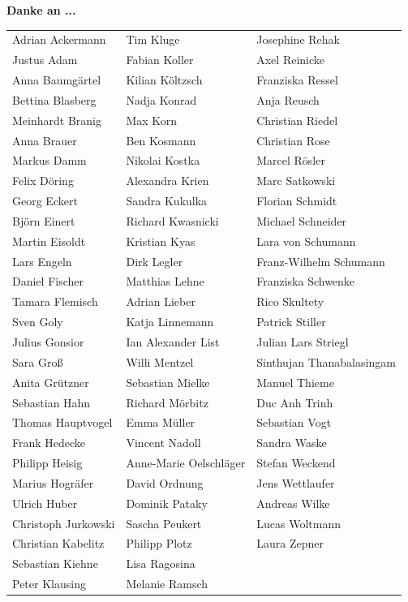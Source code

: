 \textbf{Danke an ...}
\\

\begin{tabular}{l l l} 

Adrian Ackermann & Tim Kluge & Josephine Rehak\\
Justus Adam & Fabian Koller & Axel Reinicke\\
Anna Baumgärtel & Kilian Költzsch & Franziska Ressel\\
Bettina Blasberg & Nadja Konrad & Anja Reusch\\
Meinhardt Branig & Max Korn & Christian Riedel\\
Anna Brauer & Ben Kosmann & Christian Rose\\
Markus Damm & Nikolai Kostka & Marcel Rösler\\ 
Felix Döring & Alexandra Krien & Marc Satkowski\\ 
Georg Eckert & Sandra Kukulka & Florian Schmidt\\
Björn Einert & Richard Kwasnicki & Michael Schneider\\
Martin Eisoldt & Kristian Kyas & Lara von Schumann\\
Lars Engeln & Dirk Legler & Franz-Wilhelm Schumann\\
Daniel Fischer & Matthias Lehne & Franziska Schwenke\\ 
Tamara Flemisch & Adrian Lieber & Rico Skultety\\
Sven Goly & Katja Linnemann & Patrick Stiller\\
Julius Gonsior & Ian Alexander List & Julian Lars Striegl\\
Sara Groß & Willi Mentzel & Sinthujan Thanabalasingam\\
Anita Grützner & Sebastian Mielke & Manuel Thieme\\
Sebastian Hahn & Richard Mörbitz & Duc Anh Trinh\\
Thomas Hauptvogel & Emma Müller & Sebastian Vogt\\
Frank Hedecke & Vincent Nadoll & Sandra Waske\\
Philipp Heisig & Anne-Marie Oelschläger & Stefan Weckend\\
Marius Hogräfer & David Ordnung & Jens Wettlaufer\\
Ulrich Huber & Dominik Pataky & Andreas Wilke\\
Christoph Jurkowski & Sascha Peukert & Lucas Woltmann\\
Christian Kabelitz & Philipp Plotz & Laura Zepner\\
Sebastian Kiehne & Lisa Ragosina & \\
Peter Klausing & Melanie Ramsch & \\

\end{tabular}

